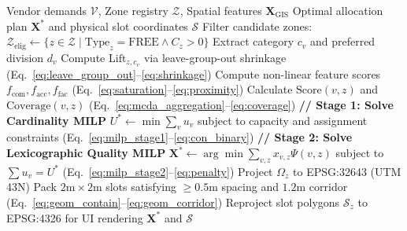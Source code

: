 \begin{algorithm}[t]
\caption{End-to-End UrbanVending AI Allocation Pipeline}
\label{alg:pipeline}
\begin{algorithmic}[1]
\Require Vendor demands $\mathcal{V}$, Zone registry $\mathcal{Z}$, Spatial features $\mathbf{X}_{\text{GIS}}$
\Ensure Optimal allocation plan $\mathbf{X}^*$ and physical slot coordinates $\mathcal{S}$
\State Filter candidate zones: $\mathcal{Z}_{\text{elig}} \gets \{z \in \mathcal{Z} \mid \text{Type}_z = \text{FREE} \land C_z > 0\}$
    \State Extract category $c_v$ and preferred division $d_v$
        \State Compute $\text{Lift}_{z,c_v}$ via leave-group-out shrinkage (Eq.~\ref{eq:leave_group_out}--\ref{eq:shrinkage})
        \State Compute non-linear feature scores $f_{\text{com}}, f_{\text{acc}}, f_{\text{fac}}$ (Eq.~\ref{eq:saturation}--\ref{eq:proximity})
        \State Calculate $\text{Score}(v,z)$ and $\text{Coverage}(v,z)$ (Eq.~\ref{eq:mcda_aggregation}--\ref{eq:coverage})
    \EndFor
\EndFor
\State \textbf{// Stage 1: Solve Cardinality MILP}
\State $U^* \gets \min \sum_{v} u_v$ subject to capacity and assignment constraints (Eq.~\ref{eq:milp_stage1}--\ref{eq:con_binary})
\State \textbf{// Stage 2: Solve Lexicographic Quality MILP}
\State $\mathbf{X}^* \gets \arg\min \sum_{v,z} x_{v,z} \Psi(v,z)$ subject to $\sum u_v = U^*$ (Eq.~\ref{eq:milp_stage2}--\ref{eq:penalty})
    \State Project $\Omega_z$ to EPSG:32643 (UTM 43N)
    \State Pack $2\text{m} \times 2\text{m}$ slots satisfying $\ge 0.5\text{m}$ spacing and $1.2\text{m}$ corridor (Eq.~\ref{eq:geom_contain}--\ref{eq:geom_corridor})
    \State Reproject slot polygons $\mathcal{S}_z$ to EPSG:4326 for UI rendering
\EndFor
\State \Return $\mathbf{X}^*$ and $\mathcal{S}$
\end{algorithmic}
\end{algorithm}
